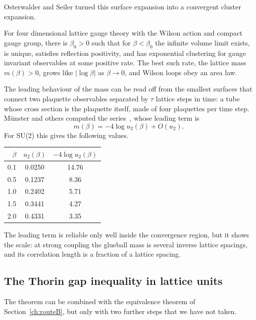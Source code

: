 Osterwalder and Seiler\cite{OSe} turned this surface expansion into a convergent cluster expansion.

\begin{theorem}
For four dimensional lattice gauge theory with the Wilson action and compact gauge group, there is $\beta_0>0$ such that for $\beta<\beta_0$ the infinite volume limit exists, is unique, satisfies reflection positivity, and has exponential clustering for gauge invariant observables at some positive rate. The best such rate, the lattice mass $m(\beta)>0$, grows like $|\log\beta|$ as $\beta\to0$, and Wilson loops obey an area law.
\end{theorem}

The leading behaviour of the mass can be read off from the smallest surfaces that connect two plaquette observables separated by $\tau$ lattice steps in time: a tube whose cross section is the plaquette itself, made of four plaquettes per time step. M\"unster and others computed the series~\cite{Mu81b}, whose leading term is
\[
m(\beta)=-4\log u_2(\beta)+O(u_2).
\]
For SU(2) this gives the following values.
\begin{center}
\begin{tabular}{rcc}
\toprule
$\beta$ & $u_2(\beta)$ & $-4\log u_2(\beta)$ \\ \midrule
0.1 & 0.0250 & 14.76 \\
0.5 & 0.1237 & 8.36 \\
1.0 & 0.2402 & 5.71 \\
1.5 & 0.3441 & 4.27 \\
2.0 & 0.4331 & 3.35 \\
\bottomrule
\end{tabular}
\end{center}
The leading term is reliable only well inside the convergence region, but it shows the scale: at strong coupling the glueball mass is several inverse lattice spacings, and its correlation length is a fraction of a lattice spacing.

\subsection{The Thorin gap inequality in lattice units}

The theorem can be combined with the equivalence theorem of Section~\ref{ch:routeB}, but only with two further steps that we have not taken.

